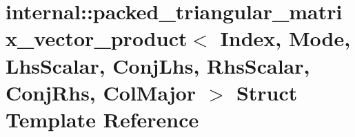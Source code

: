 \hypertarget{structinternal_1_1packed__triangular__matrix__vector__product_3_01_index_00_01_mode_00_01_lhs_scbd6db00b6d9348a4e2779e2616adcdaa}{}\section{internal\+:\+:packed\+\_\+triangular\+\_\+matrix\+\_\+vector\+\_\+product$<$ Index, Mode, Lhs\+Scalar, Conj\+Lhs, Rhs\+Scalar, Conj\+Rhs, Col\+Major $>$ Struct Template Reference}
\label{structinternal_1_1packed__triangular__matrix__vector__product_3_01_index_00_01_mode_00_01_lhs_scbd6db00b6d9348a4e2779e2616adcdaa}
